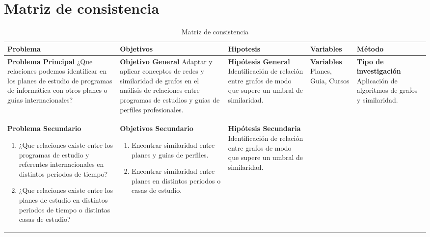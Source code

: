 \newpage

\section{Matriz de consistencia}

\begin{table}[h]
\centering
\caption{Matriz de consistencia}
\begin{tabularx}{1.0\textwidth}
{ 
  | >{\raggedright\arraybackslash}X 
  | >{\raggedright\arraybackslash}X 
  | >{\raggedright\arraybackslash}X 
  | >{\raggedright\arraybackslash}X 
  | >{\raggedright\arraybackslash}X |}
 \hline
Problema&Objetivos&Hipotesis&Variables&Método\\
\hline
\scriptsize
\textbf{Problema Principal}\break 
¿Que relaciones podemos identificar en los planes de estudio de programas de informática con otros planes o guías internacionales?&
\scriptsize
\textbf{Objetivo General}\break
Adaptar y aplicar conceptos de redes y similaridad de grafos en el análisis de relaciones entre programas de estudios y guias de perfiles profesionales.&
\scriptsize
\textbf{Hipótesis General}\break
Identificación de relación entre grafos de modo que supere un umbral de similaridad.&
\scriptsize
\textbf{Variables}\break
Planes, Guia, Cursos&
\scriptsize
\textbf{Tipo de investigación}\break
Aplicación de algoritmos de grafos y similaridad.\\
\hline
\scriptsize
\textbf{Problema Secundario}\break
\begin{enumerate}[wide, labelwidth=!, labelindent=0pt]
\item ¿Que relaciones existe entre los programas de estudio  y referentes internacionales en distintos periodos de tiempo?
\item ¿Que relaciones existe entre los planes de estudio en distintos periodos de tiempo o distintas casas de estudio?
\end{enumerate}&
\scriptsize
\textbf{Objetivos Secundario}\break
\begin{enumerate}[wide, labelwidth=!, labelindent=0pt]
\item Encontrar similaridad entre planes y guias de perfiles.
\item Encontrar similaridad entre planes en distintos periodos o casas de estudio.
\end{enumerate}&
\scriptsize
\textbf{Hipótesis Secundaria}\break
Identificación de relación entre grafos de modo que supere un umbral de similaridad.
\begin{enumerate}[wide, labelwidth=!, labelindent=0pt]

\end{enumerate}
\end{tabularx}
\end{table}

